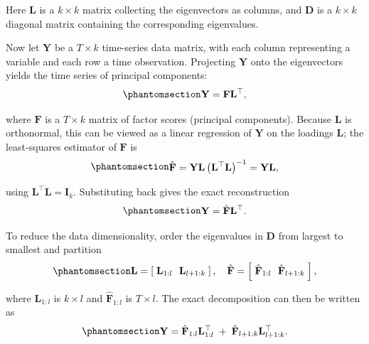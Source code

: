\documentclass[
  letterpaper,
  DIV=11,
  numbers=noendperiod]{scrreprt}
\begin{document}
Here \(\mathbf{L}\) is a \(k\times k\) matrix collecting the
eigenvectors as columns, and \(\mathbf{D}\) is a \(k\times k\) diagonal
matrix containing the corresponding eigenvalues.

Now let \(\mathbf{Y}\) be a \(T\times k\) time-series data matrix, with
each column representing a variable and each row a time observation.
Projecting \(\mathbf{Y}\) onto the eigenvectors yields the time series
of principal components:
\begin{equation}\protect\phantomsection\label{eq-gen-0057}{  
\begin{align}
    \mathbf{Y} = \mathbf{F}\mathbf{L}^{\top},
\end{align}
}\end{equation}

where \(\mathbf{F}\) is a \(T\times k\) matrix of factor scores
(principal components). Because \(\mathbf{L}\) is orthonormal, this can
be viewed as a linear regression of \(\mathbf{Y}\) on the loadings
\(\mathbf{L}\); the least-squares estimator of \(\mathbf{F}\) is
\begin{equation}\protect\phantomsection\label{eq-gen-0058}{  
\begin{align}
    \hat{\mathbf{F}} 
    = \mathbf{Y}\mathbf{L}\left(\mathbf{L}^{\top}\mathbf{L}\right)^{-1} 
    = \mathbf{Y}\mathbf{L},
\end{align}
}\end{equation}

using \(\mathbf{L}^{\top}\mathbf{L} = \mathbf{I}_k\). Substituting back
gives the exact reconstruction
\begin{equation}\protect\phantomsection\label{eq-gen-0059}{  
\begin{align}
    \mathbf{Y} = \hat{\mathbf{F}}\mathbf{L}^{\top}.
\end{align}
}\end{equation}

To reduce the data dimensionality, order the eigenvalues in
\(\mathbf{D}\) from largest to smallest and partition
\begin{equation}\protect\phantomsection\label{eq-gen-0060}{  
\begin{align}
    \mathbf{L} = \left[\;\mathbf{L}_{1:l}\ \ \mathbf{L}_{l+1:k}\;\right], 
    \quad
    \hat{\mathbf{F}} = \left[\;\hat{\mathbf{F}}_{1:l}\ \ \hat{\mathbf{F}}_{l+1:k}\;\right],
\end{align}
}\end{equation}

where \(\mathbf{L}_{1:l}\) is \(k\times l\) and
\(\hat{\mathbf{F}}_{1:l}\) is \(T\times l\). The exact decomposition can
then be written as
\begin{equation}\protect\phantomsection\label{eq-gen-0061}{  
\begin{align}
    \mathbf{Y} = \hat{\mathbf{F}}_{1:l}\mathbf{L}_{1:l}^{\top} 
      \;+\; \hat{\mathbf{F}}_{l+1:k}\mathbf{L}_{l+1:k}^{\top}.
\end{align}
}\end{equation}
\end{document}
